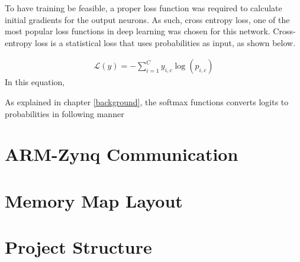 To have training be feasible, a proper loss function was required to calculate initial gradients for the output neurons. As such, cross entropy loss, one of the most popular loss functions in deep learning was chosen for this network. Cross-entropy loss is a statistical loss that uses probabilities as input, as shown below.



\begin{align}
\mathcal{L}(y) = - \sum_{i = 1}^{C}y_{i,c}\log(p_{i,c})
\end{align}
In this equation, 

As explained in chapter \ref{background}, the softmax functions converts logits to probabilities in following manner

\section{ARM-Zynq Communication}
\section{Memory Map Layout}

\section{Project Structure}


